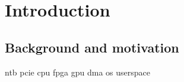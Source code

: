 \chapter{Introduction}\label{sec:intro}
\section{Background and motivation}






\gls{ntb}
\gls{pcie}
\gls{cpu}
\gls{fpga}
\gls{gpu}
\gls{dma}
\gls{os}
\gls{userspace}

